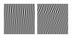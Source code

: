 \begin{figure}
\begin{center}
  \includegraphics[width=\columnwidth/9]{ch4/figures/imag_0_0.jpg}
  \includegraphics[width=\columnwidth/9]{ch4/figures/imag_0_1.jpg}

\end{center}
\end{figure}
